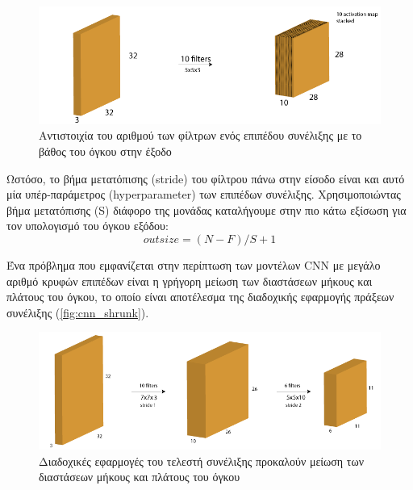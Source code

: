 \begin{figure}[!ht]
  \centering
  \includegraphics[width=1\textwidth]{./images/chapter3/cnn_num_filters.png}
  \caption[Αντιστοιχία του αριθμού των φίλτρων ενός επιπέδου συνέλιξης με το βάθος του όγκου στην έξοδο]{Αντιστοιχία του αριθμού των φίλτρων ενός επιπέδου συνέλιξης με το βάθος του όγκου στην έξοδο}
  \label{fig:cnn_num_filters}
\end{figure}

Ωστόσο, το βήμα μετατόπισης (stride) του φίλτρου πάνω στην είσοδο είναι και αυτό
μία υπέρ-παράμετρος (hyperparameter) των επιπέδων συνέλιξης.
Χρησιμοποιώντας βήμα μετατόπισης (S) διάφορο της μονάδας καταλήγουμε στην πιο κάτω
εξίσωση για τον υπολογισμό του όγκου εξόδου:
\begin{equation*}
  outsize = (N-F)/S + 1
\end{equation*}

Ένα πρόβλημα που εμφανίζεται στην περίπτωση των μοντέλων CNN με μεγάλο αριθμό
κρυφών επιπέδων είναι η γρήγορη μείωση των διαστάσεων μήκους και πλάτους του
όγκου, το οποίο είναι αποτέλεσμα της διαδοχικής εφαρμογής πράξεων συνέλιξης (\autoref{fig:cnn_shrunk}).

\begin{figure}[!ht]
  \centering
  \includegraphics[width=1\textwidth]{./images/chapter3/cnn_shrunk.png}
  \caption[Διαδοχικές εφαρμογές του τελεστή συνέλιξης προκαλούν μείωση των διαστάσεων μήκους και πλάτους του όγκου]{Διαδοχικές εφαρμογές του τελεστή συνέλιξης προκαλούν μείωση των διαστάσεων μήκους και πλάτους του όγκου}
  \label{fig:cnn_shrunk}
\end{figure}

